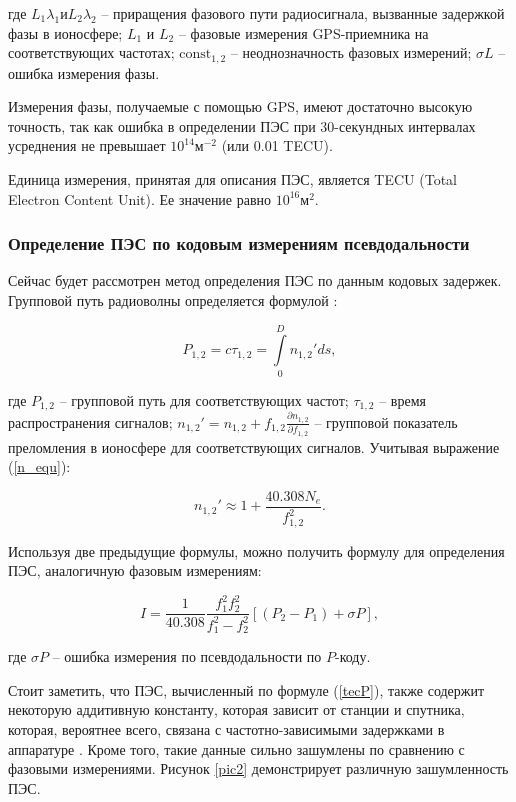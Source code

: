 \documentclass[14pt]{article}
\begin{document}
где $L_1\lambda_1 \text{и} L_2 \lambda_2$ -- приращения фазового пути радиосигнала, вызванные задержкой фазы в ионосфере; $L_1$ и $L_2$ -- фазовые измерения GPS-приемника на соответствующих частотах; $\text{const}_{1,2}$ -- неоднозначность фазовых измерений; $\sigma L$ -- ошибка измерения фазы.

Измерения фазы, получаемые с помощью GPS, имеют достаточно высокую точность, так как ошибка в определении ПЭС при 30-секундных интервалах усреднения не превышает $10^{14} \text{м}^{-2}$ (или 0.01 TECU). 

Единица измерения, принятая для описания ПЭС, является TECU (Total Electron Content Unit). Ее значение равно $10^{16} \text{м}^2$.

\subsubsection{Определение ПЭС по кодовым измерениям псевдодальности}
Сейчас будет рассмотрен метод определения ПЭС  по данным кодовых задержек. Групповой путь радиоволны определяется формулой \cite{devis}:

\begin{equation}
P_{1,2} = c \tau_{1,2} = \int \limits_{0}^{D} n_{1,2}' ds,
\end{equation}

где $P_{1,2}$ -- групповой путь для соответствующих частот; $\tau_{1,2}$ -- время распространения сигналов; 
$n_{1,2}' = n_{1,2} + f_{1,2} \frac{\partial n_{1,2}}{\partial f_{1,2}}$ -- групповой показатель преломления в ионосфере для соответствующих сигналов. Учитывая выражение (\ref{n_equ}):

\begin{equation}
n_{1,2}' \approx 1 + \frac{40.308 N_e}{f_{1,2}^2}.
\end{equation}

Используя две предыдущие формулы, можно получить формулу для определения ПЭС, аналогичную фазовым измерениям:

\begin{equation}
\label{tecP}
I = \frac{1}{40.308} \frac{f_1^2 f_2^2}{f_1^2 - f_2^2} \left[ \left( P_2 - P_1 \right) + \sigma P \right],
\end{equation} 

где $\sigma P $ -- ошибка измерения по псевдодальности по $P$-коду.

Стоит заметить, что ПЭС, вычисленный по формуле (\ref{tecP}), также содержит некоторую аддитивную константу, которая зависит от станции и спутника, которая, вероятнее всего, связана с частотно-зависимыми задержками в аппаратуре \cite{kozharin}. Кроме того, такие данные сильно зашумлены по сравнению с фазовыми измерениями. Рисунок \ref{pic2} демонстрирует различную зашумленность ПЭС. 
\end{document}
